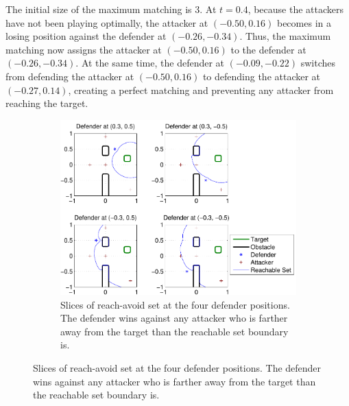 The initial size of the maximum matching is 3. At $t=0.4$, because the attackers have not been playing optimally, the attacker at $(-0.50,0.16)$ becomes in a losing position against the defender at $(-0.26, -0.34)$. Thus, the maximum matching now assigns the attacker at $(-0.50,0.16)$ to the defender at $(-0.26, -0.34)$. At the same time, the defender at $(-0.09, -0.22)$ switches from defending the attacker at $(-0.50,0.16)$ to defending the attacker at $(-0.27,0.14)$, creating a perfect matching and preventing any attacker from reaching the target.
\begin{figure}[h]
\centering
	\begin{subfigure}{0.5\textwidth}
	\centering
	\includegraphics[width=\textwidth]{"fig/fixed defender 1"}
	\caption{Slices of reach-avoid set at the four defender positions. The defender wins against any attacker who is farther away from the target than the reachable set boundary is.}
	\label{subfig:fixed_d_1}
	\end{subfigure}	
	

\end{figure}
